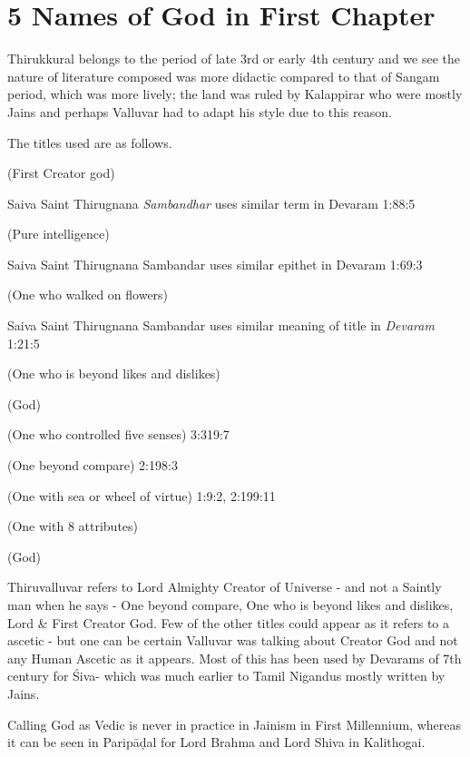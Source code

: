 \section*{5 Names of God in First Chapter}

Thirukkural belongs to the period of late 3rd or early 4th century and we see the nature of literature composed was more didactic compared to that of Sangam period, which was more lively; the land was ruled by Kalappirar who were mostly Jains and perhaps Valluvar had to adapt his style due to this reason.

The titles used are as follows.

 (First Creator god)

Saiva Saint Thirugnana \textit{Sambandhar} uses similar term in Devaram 1:88:5

 (Pure intelligence)

Saiva Saint Thirugnana Sambandar uses similar epithet in Devaram 1:69:3

 (One who walked on flowers)

Saiva Saint Thirugnana Sambandar uses similar meaning of title in \textit{Devaram} 1:21:5

 (One who is beyond likes and dislikes)

 (God)

 (One who controlled five senses) 3:319:7

 (One beyond compare) 2:198:3

 (One with sea or wheel of virtue) 1:9:2, 2:199:11

 (One with 8 attributes)

 (God)

Thiruvalluvar refers to Lord Almighty Creator of Universe - and not a Saintly man when he says - One beyond compare, One who is beyond likes and dislikes, Lord \& First Creator God. Few of the other titles could appear as it refers to a ascetic - but one can be certain Valluvar was talking about Creator God and not any Human Ascetic as it appears. Most of this has been used by Devarams of 7th century for Śiva- which was much earlier to Tamil Nigandus mostly written by Jains.

Calling God as Vedic is never in practice in Jainism in First Millennium, whereas it can be seen in Paripāḍal for Lord Brahma and Lord Shiva in Kalithogai.

